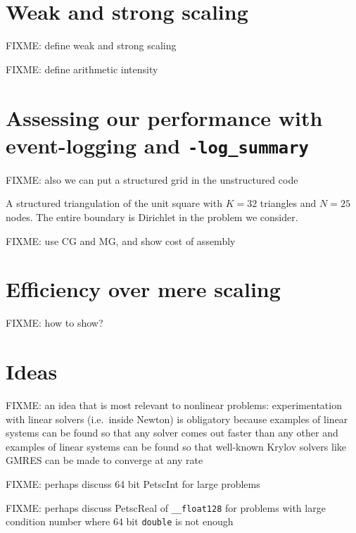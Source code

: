 
\section{Weak and strong scaling}

FIXME: define weak and strong scaling

FIXME: define arithmetic intensity

\section{Assessing our performance with event-logging and \texttt{-log\_summary}}

\vspace{4cm}

FIXME: also we can put a structured grid in the unstructured code

\begin{marginfigure}

\caption{A structured triangulation of the unit square with $K=32$ triangles and $N=25$ nodes.  The entire boundary is Dirichlet in the problem we consider.}
\label{fig:structuredfem}
\end{marginfigure}

FIXME: use CG and MG, and show cost of assembly

\section{Efficiency over mere scaling}

FIXME: how to show?

\section{Ideas}

FIXME: an idea that is most relevant to nonlinear problems: experimentation with linear solvers (i.e.~inside Newton) is obligatory because examples of linear systems can be found so that any solver comes out faster than any other \citep{Nachtigaletal1992} and examples of linear systems can be found so that well-known Krylov solvers like GMRES can be made to converge at any rate \citep{Greenbaumetal1996}

FIXME: perhaps discuss 64 bit PetscInt for large problems

FIXME: perhaps discuss PetscReal of \verb|__float128| for problems with large condition number where 64 bit \texttt{double} is not enough